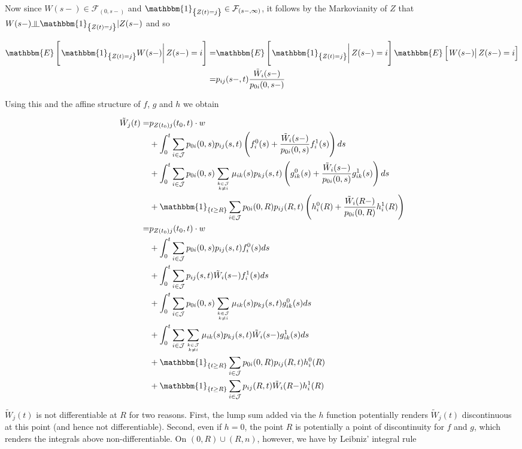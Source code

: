 \documentclass{book}
\newcommand{\indep}{\rotatebox[origin=c]{90}{$\models$}}
\newcommand{\1}[1]{\mathbbm{1}_{\left\lbrace #1 \right\rbrace}}
\newcommand{\econd}[2][def]{\mathbbm{E} \left[ \left. #1 \right| #2 \right]}
\theoremstyle{break}
\theoremstyle{remark}
\numberwithin{equation}{section}
\begin{document}
Now since $W(s-) \in  \mathcal{F}_{\left( 0,s- \right)}$ and $\1{Z(t)=j} \in \mathcal{F}_{\left( s-,\infty \right)}$, it follows by the Markovianity of $Z$ that $W(s-) \indep \1{Z(t)=j} | Z(s-)$ and so

\begin{align*}
	\econd[\1{Z(t)=j}W(s-)]{Z(s-)=i} =& \econd[\1{Z(t)=j}]{Z(s-)=i} \econd[W(s-)]{Z(s-)=i} \\
	=& p_{ij}(s-,t) \frac{\tilde{W}_i(s-)}{p_{0i}(0,s-)}
\end{align*}


Using this and the affine structure of $f$, $g$ and $h$ we obtain

\begin{align}
\tilde{W}_j(t) =& p_{Z(t_0)j}(t_0,t) \cdot w \\
&+ \int_0^t \sum_{i \in \mathcal{J}} p_{0i}(0,s) p_{ij}(s,t) \left( f_i^0(s) + \frac{\tilde{W}_i(s-)}{p_{0i}(0,s)} f_i^1(s) \right) ds \\
&+ \int_0^t \sum_{i \in \mathcal{J}} p_{0i}(0,s) \sum_{k \in \mathcal{J} \atop k \neq i} \mu_{ik}(s) p_{kj}(s,t) \left( g_{ik}^0(s) + \frac{\tilde{W}_i(s-)}{p_{0i}(0,s)} g_{ik}^1(s) \right) ds \\
&+ \1{t \geq R}\sum_{i \in \mathcal{J}} p_{0i}(0,R) p_{ij}(R,t) \left( h_i^0(R) + \frac{\tilde{W}_i(R-)}{p_{0i}(0,R)} h_i^1(R) \right) \\
=& p_{Z(t_0)j}(t_0,t) \cdot w \label{FirstLineA} \\
&+ \int_0^t \sum_{i \in \mathcal{J}} p_{0i}(0,s) p_{ij}(s,t) f_i^0(s) ds \\
&+ \int_0^t \sum_{i \in \mathcal{J}} p_{ij}(s,t) \tilde{W}_i(s-) f_i^1(s) ds \\
&+ \int_0^t \sum_{i \in \mathcal{J}} p_{0i}(0,s) \sum_{k \in \mathcal{J} \atop k \neq i} \mu_{ik}(s) p_{kj}(s,t) g_{ik}^0(s) ds \\
&+ \int_0^t \sum_{i \in \mathcal{J}} \sum_{k \in \mathcal{J} \atop k \neq i} \mu_{ik}(s) p_{kj}(s,t) \tilde{W}_i(s-) g_{ik}^1(s) ds \\
&+ \1{t \geq R}\sum_{i \in \mathcal{J}} p_{0i}(0,R) p_{ij}(R,t) h_i^0(R) \label{FirstGlue} \\
&+ \1{t \geq R}\sum_{i \in \mathcal{J}} p_{ij}(R,t) \tilde{W}_i(R-) h_i^1(R) \label{SecondGlue}
\end{align}

$\tilde{W}_j(t)$ is not differentiable at $R$ for two reasons. First, the lump sum added via the $h$ function potentially renders $\tilde{W}_j(t)$ discontinuous at this point (and hence not differentiable). Second, even if $h=0$, the point $R$ is potentially a point of discontinuity for $f$ and $g$, which renders the integrals above non-differentiable. On $(0,R)\cup(R,n)$, however, we have by Leibniz' integral rule
\end{document}
